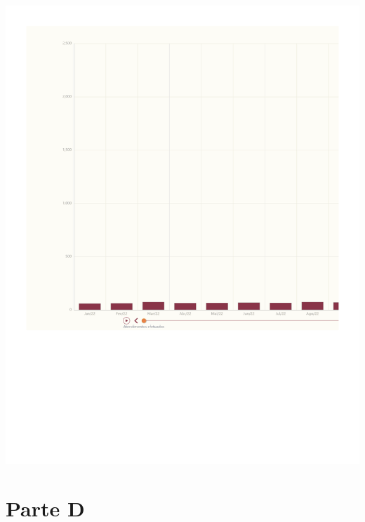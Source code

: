 \documentclass[
  letterpaper,
  DIV=11,
  numbers=noendperiod]{scrreprt}
\begin{document}
\includegraphics{2022_files/figure-pdf/unnamed-chunk-4-1.pdf}

\section{Parte D}
\end{document}
